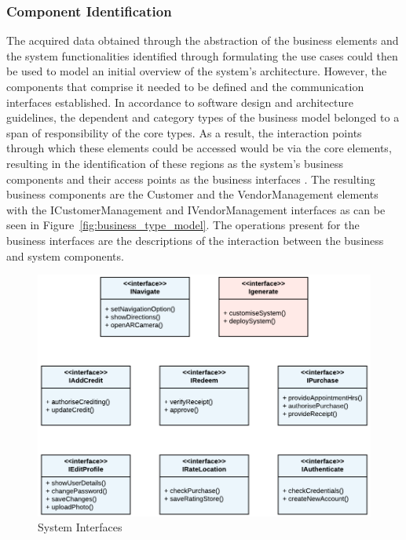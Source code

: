 \subsubsection{Component Identification}
The acquired data obtained through the abstraction of the business elements and the system functionalities identified through formulating the use cases could then be used to model an initial overview of the system's architecture. However, the components that comprise it needed to be defined and the communication interfaces established. In accordance to software design and architecture guidelines, the dependent and category types of the business model belonged to a span of responsibility of the core types. As a result, the interaction points through which these elements could be accessed would be via the core elements, resulting in the identification of these regions as the system's business components and their access points as the business interfaces \cite{hamza_2017}. The resulting business components are the Customer and the VendorManagement elements with the ICustomerManagement and IVendorManagement interfaces as can be seen in Figure~\ref{fig:business_type_model}. The operations present for the business interfaces are the descriptions of the interaction between the business and system components.\\

\begin{figure}[!ht]
\centering
\includegraphics[scale=0.3]{img/System_Interfaces.png}
\caption{System Interfaces}
\label{fig:system_interfaces}
\end{figure}

